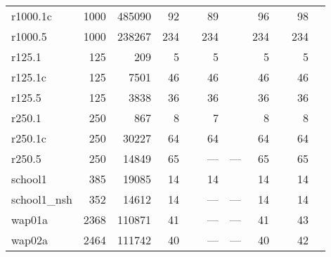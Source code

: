 \begin{longtable}{lrrrlrlrlrl}
  r1000.1c & 1000 & 485090 & 92 & \cite{us} & 89 & \cite{Held2011} & 96 & \cite{Held2011,Gualandi2012} & 98 & \cite{Morgenstern1996,FunabikiNobuoandHigashino2000,Malaguti2008,Gualandi2012,Porumbel2010,Lu2010,Titiloye2011,Moalic2015} \\ 
  r1000.5 & 1000 & 238267 & 234 & \cite{us} & 234 & \cite{us} & 234 & \cite{Malaguti2010,Gualandi2012} & 234 & \cite{Malaguti2008,Gualandi2012} \\ 
  r125.1 & 125 & 209 & 5 & \cite{Gualandi2012} & 5 & \cite{Gualandi2012} & 5 & \cite{Gualandi2012} & 5 & \cite{Zhou2016,Gualandi2012,Zhou2018} \\ 
  r125.1c & 125 & 7501 & 46 & \cite{Gualandi2012} & 46 & \cite{Gualandi2012} & 46 & \cite{Gualandi2012} & 46 & \cite{Zhou2016,Gualandi2012,Zhou2018} \\ 
  r125.5 & 125 & 3838 & 36 & \cite{Gualandi2012} & 36 & \cite{Gualandi2012} & 36 & \cite{Gualandi2012} & 36 & \cite{Gualandi2012} \\ 
  r250.1 & 250 & 867 & 8 & \cite{us} & 7 & \cite{Gualandi2012} & 8 & \cite{Malaguti2010,Gualandi2012} & 8 & \cite{Zhou2016,Morgenstern1996,FunabikiNobuoandHigashino2000,Malaguti2008,Zhou2018,Gualandi2012} \\ 
  r250.1c & 250 & 30227 & 64 & \cite{us} & 64 & \cite{us} & 64 & \cite{Malaguti2010,Gualandi2012} & 64 & \cite{Zhou2016,Morgenstern1996,BlochligerI.andZufferey2004,FunabikiNobuoandHigashino2000,Malaguti2008,Zhou2018,Gualandi2012} \\ 
  r250.5 & 250 & 14849 & 65 & \cite{us} & --- & --- & 65 & \cite{Malaguti2010,Gualandi2012} & 65 & \cite{Morgenstern1996,FunabikiNobuoandHigashino2000,Malaguti2008,Porumbel2010,Lu2010,Titiloye2011,Moalic2015,Gualandi2012} \\ 
  school1 & 385 & 19085 & 14 & \cite{Malaguti2011,Gualandi2012} & 14 & \cite{Gualandi2012} & 14 & \cite{Mendez-Diaz2006,Gualandi2012,Malaguti2011} & 14 & \cite{Zhou2016,Mendez-Diaz2006,Malaguti2011,Zhou2018,Gualandi2012,Mendez-Diaz2006,Brelaz1979,Sewell1996,Segundo2012} \\ 
  school1\_nsh & 352 & 14612 & 14 & \cite{us} & --- & --- & 14 & \cite{Mendez-Diaz2006,Malaguti2011} & 14 & \cite{Zhou2016,Mendez-Diaz2006,Malaguti2011,Zhou2018,Mendez-Diaz2006,Brelaz1979,Sewell1996,Segundo2012} \\ 
  wap01a & 2368 & 110871 & 41 & \cite{Held2011} & --- & --- & 41 & \cite{Mendez-Diaz2006,Held2011} & 43 & \cite{Malaguti2011} \\ 
  wap02a & 2464 & 111742 & 40 & \cite{Held2011,Malaguti2011} & --- & --- & 40 & \cite{Mendez-Diaz2006,Held2011} & 42 & \cite{Malaguti2011} \\ 

\end{longtable}
